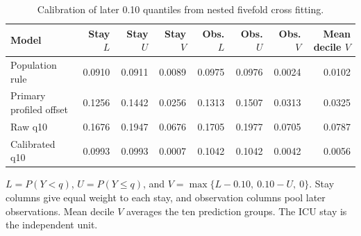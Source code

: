 \begin{table}[!htbp]
\caption{Calibration of later 0.10 quantiles from nested fivefold cross fitting.}
\label{tab:tie_aware_calibration_summary}
\centering
\scriptsize
\begin{tabular}{lrrrrrrr}
\hline
Model & Stay $L$ & Stay $U$ & Stay $V$ & Obs. $L$ & Obs. $U$ & Obs. $V$ & Mean decile $V$\\
\hline
Population rule & 0.0910 & 0.0911 & 0.0089 & 0.0975 & 0.0976 & 0.0024 & 0.0102\\
Primary profiled offset & 0.1256 & 0.1442 & 0.0256 & 0.1313 & 0.1507 & 0.0313 & 0.0325\\
Raw q10 & 0.1676 & 0.1947 & 0.0676 & 0.1705 & 0.1977 & 0.0705 & 0.0787\\
Calibrated q10 & 0.0993 & 0.0993 & 0.0007 & 0.1042 & 0.1042 & 0.0042 & 0.0056\\
\hline
\end{tabular}
\par\smallskip
\footnotesize{$L=P(Y<q)$, $U=P(Y\le q)$, and $V=\max\{L-0.10,\ 0.10-U,\ 0\}$. Stay columns give equal weight to each stay, and observation columns pool later observations. Mean decile $V$ averages the ten prediction groups. The ICU stay is the independent unit.}
\end{table}
